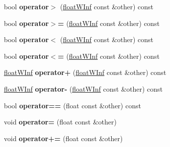 \begin{DoxyCompactItemize}
\item 
\hypertarget{classfloatWInf_ac0d837433a39b4b8fce61e251c098a28}{
bool {\bfseries operator$>$} (\hyperlink{classfloatWInf}{floatWInf} const \&other) const }
\label{classfloatWInf_ac0d837433a39b4b8fce61e251c098a28}

\item 
\hypertarget{classfloatWInf_acce9cdc9bb9d3718a0ceb53fe8af9b28}{
bool {\bfseries operator$>$=} (\hyperlink{classfloatWInf}{floatWInf} const \&other) const }
\label{classfloatWInf_acce9cdc9bb9d3718a0ceb53fe8af9b28}

\item 
\hypertarget{classfloatWInf_ae9229c19b88f4b5682036363ae90d666}{
bool {\bfseries operator$<$} (\hyperlink{classfloatWInf}{floatWInf} const \&other) const }
\label{classfloatWInf_ae9229c19b88f4b5682036363ae90d666}

\item 
\hypertarget{classfloatWInf_ab3f84bf6ec47ad39b9ce92f3527d53d4}{
bool {\bfseries operator$<$=} (\hyperlink{classfloatWInf}{floatWInf} const \&other) const }
\label{classfloatWInf_ab3f84bf6ec47ad39b9ce92f3527d53d4}

\item 
\hypertarget{classfloatWInf_ac714728f617c425f5fea481f30c97dad}{
\hyperlink{classfloatWInf}{floatWInf} {\bfseries operator+} (\hyperlink{classfloatWInf}{floatWInf} const \&other) const }
\label{classfloatWInf_ac714728f617c425f5fea481f30c97dad}

\item 
\hypertarget{classfloatWInf_a50e77b9fe3e92cd8eaf12344b2a04b3b}{
\hyperlink{classfloatWInf}{floatWInf} {\bfseries operator-\/} (\hyperlink{classfloatWInf}{floatWInf} const \&other) const }
\label{classfloatWInf_a50e77b9fe3e92cd8eaf12344b2a04b3b}

\item 
\hypertarget{classfloatWInf_a6a78ccecc06b2c0eecab8444276bd8b9}{
bool {\bfseries operator==} (float const \&other) const }
\label{classfloatWInf_a6a78ccecc06b2c0eecab8444276bd8b9}

\item 
\hypertarget{classfloatWInf_af830aacbe8961e27e24d685cdc2fb09e}{
void {\bfseries operator=} (float const \&other)}
\label{classfloatWInf_af830aacbe8961e27e24d685cdc2fb09e}

\item 
\hypertarget{classfloatWInf_aa7cdcd978e3faeaaf897fc57a83d6b11}{
void {\bfseries operator+=} (float const \&other)}
\label{classfloatWInf_aa7cdcd978e3faeaaf897fc57a83d6b11}


\end{DoxyCompactItemize}

